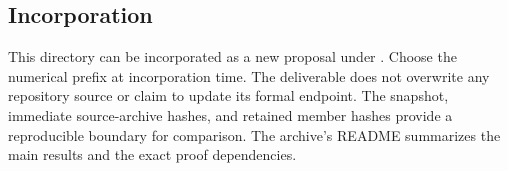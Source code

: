 \subsection*{Incorporation}
This directory can be incorporated as a new proposal under
.
Choose the numerical prefix at incorporation time. The deliverable does
not overwrite any repository source or claim to update its formal endpoint.
The snapshot, immediate source-archive hashes, and retained member hashes
provide a reproducible boundary for comparison. The archive's README
summarizes the main results and the exact proof dependencies.

